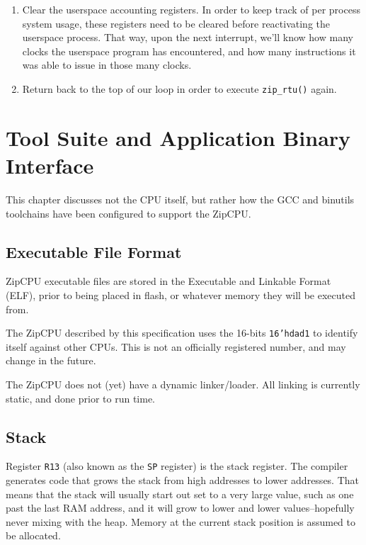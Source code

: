 \documentclass{gqtekspec}
\begin{document}
\begin{enumerate}
\item Clear the userspace accounting registers.  In order to keep track of
	per process system usage, these registers need to be cleared before
	reactivating the userspace process.  That way, upon the next
	interrupt, we'll know how many clocks the userspace program has
	encountered, and how many instructions it was able to issue in
	those many clocks. 

\item Return back to the top of our loop in order to execute {\tt zip\_rtu()}
	again.
\end{enumerate}

\chapter{Tool Suite and Application Binary Interface}\label{chap:abi}
This chapter discusses not the CPU itself, but rather how the GCC and binutils
toolchains have been configured to support the ZipCPU.


\section{Executable File Format}\label{sec:abi-elf}
ZipCPU executable files are stored in the Executable and Linkable Format
(ELF), prior to being placed in flash, or whatever memory they will be
executed from.  

The ZipCPU described by this specification uses the 16-bits {\tt 16'hdad1}
to identify itself against other CPUs.  This is not an officially registered
number, and may change in the future.

The ZipCPU does not (yet) have a dynamic linker/loader.  All linking is
currently static, and done prior to run time.

\section{Stack}\label{sec:abi-stack}
Register {\tt R13} (also known as the {\tt SP} register) is the stack register.
The compiler generates code that grows the stack from
high addresses to lower addresses.  That means that the stack will usually
start out set to a very large value, such as one past the last RAM address,
and it will grow to lower and lower values--hopefully never mixing with the
heap.  Memory at the current stack position is assumed to be allocated.
\end{document}
